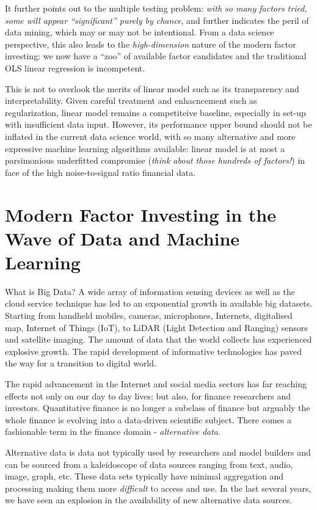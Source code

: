 \documentclass[
]{book}
\begin{document}
It further points out to the multiple testing problem: \emph{with so many factors tried, some will appear ``significant'' purely by chance}, and further indicates the peril of data mining, which may or may not be intentional. From a data science perspective, this also leads to the {\emph{high-dimension}} nature of the modern factor investing: we now have a ``zoo'' of available factor candidates and the traditional OLS linear regression is incompetent.

This is not to overlook the merits of linear model such as its transparency and interpretability. Given careful treatment and enhacncement such as regularization, linear model remains a competiteive baseline, especially in set-up with insufficient data input. However, its performance upper bound should not be inflated in the current data science world, with so many alternative and more expressive machine learning algorithms available: linear model is at most a parsimonious underfitted compromise (\emph{think about those hundreds of factors!}) in face of the high noise-to-signal ratio financial data.

\hypertarget{modern-factor-investing-in-the-wave-of-data-and-machine-learning}{%
\section{Modern Factor Investing in the Wave of Data and Machine Learning}\label{modern-factor-investing-in-the-wave-of-data-and-machine-learning}}

What is Big Data? A wide array of information sensing devices as well as the cloud service technique has led to an exponential growth in available big datasets. Starting from handheld mobiles, cameras, microphones, Internets, digitalised map, Internet of Things (IoT), to LiDAR (Light Detection and Ranging) sensors and satellite imaging. The amount of data that the world collects has experienced explosive growth. The rapid development of informative technologies has paved the way for a transition to digital world.

The rapid advancement in the Internet and social media sectors has far reaching effects not only on our day to day lives; but also, for finance researchers and investors. Quantitative finance is no longer a subclass of finance but arguably the whole finance is evolving into a data-driven scientific subject. There comes a fashionable term in the finance domain - {\emph{alternative data}}.

Alternative data is data not typically used by researchers and model builders and can be sourced from a kaleidoscope of data sources ranging from text, audio, image, graph, etc. These data sets typically have minimal aggregation and processing making them more {\emph{difficult}} to access and use. In the last several years, we have seen an explosion in the availability of new alternative data sources.
\end{document}
